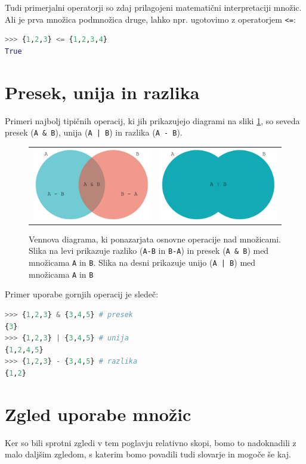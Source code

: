 Tudi primerjalni operatorji so zdaj prilagojeni matematični interpretaciji množic. Ali je prva množica podmnožica druge, lahko npr. ugotovimo z operatorjem \texttt{<=}:
\begin{lstlisting}[language=Python]
>>> {1,2,3} <= {1,2,3,4}
True
\end{lstlisting}

\section{Presek, unija in razlika}

Primeri najbolj tipičnih operacij, ki jih prikazujejo diagrami na sliki \ref{img:mnozice}, so seveda presek (\texttt{A \& B}), unija (\texttt{A | B}) in razlika (\texttt{A - B}).
\begin{figure}
    \centering
    \begin{tabular}{cc}
    \includegraphics[width=0.45\linewidth]{img/mnozice1.pdf} & \includegraphics[width=0.45\linewidth]{img/mnozice2.pdf}\\
    \end{tabular}
    \caption{Vennova diagrama, ki ponazarjata osnovne operacije nad množicami. Slika na levi prikazuje razliko (\texttt{A-B} in \texttt{B-A}) in presek (\texttt{A \& B}) med množicama \texttt{A} in \texttt{B}. Slika na desni prikazuje unijo (\texttt{A | B}) med množicama \texttt{A} in \texttt{B}}
    \label{img:mnozice}
\end{figure}
Primer uporabe gornjih operacij je sledeč:
\begin{lstlisting}[language=Python]
>>> {1,2,3} & {3,4,5} # presek
{3}
>>> {1,2,3} | {3,4,5} # unija
{1,2,4,5}
>>> {1,2,3} - {3,4,5} # razlika
{1,2}
\end{lstlisting}

\section{Zgled uporabe množic}
Ker so bili sprotni zgledi v tem poglavju relativno skopi, bomo to nadoknadili z malo daljšim zgledom, s katerim bomo povadili tudi slovarje in mogoče še kaj. 
